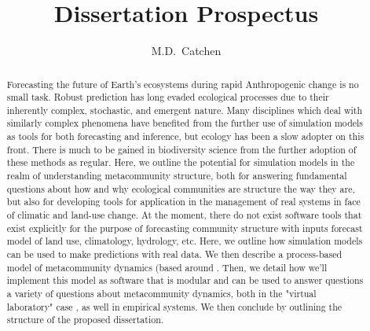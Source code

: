 \documentclass[]{article}
\title{Dissertation Prospectus}
\author{M.D.~Catchen}
\date{}
\begin{document}
\maketitle
\begin{abstract}
Forecasting the future of Earth's ecosystems during rapid Anthropogenic change is no small task.
Robust prediction has long evaded ecological processes due to their inherently complex, stochastic, and emergent nature.
Many disciplines which deal with similarly complex phenomena have benefited from the further use of simulation models as tools for both forecasting and inference, but ecology has been a slow adopter on this front.
There is much to be gained in biodiversity science from the further adoption of these methods as regular.
Here, we outline the potential for simulation models in the realm of understanding metacommunity structure, both for answering fundamental questions about how and why ecological communities are structure the way they are, but also for developing tools for application in the management of real systems in face of climatic and land-use change.
At the moment, there do not exist software tools that exist explicitly for the purpose of forecasting community structure with inputs forecast model of land use, climatology, hydrology, etc.
Here, we outline how simulation models can be used to make predictions with real data.
We then describe a process-based model of metacommunity dynamics (based around \citep{vellend_conceptual_2010, poisot_beyond_2015, thompson_process-based_2020}.
Then, we detail how we'll implement this model as software that is modular and can be used to answer questions a variety of questions about metacommunity dynamics, both in the "virtual laboratory" case \citep{railsback_agent-based_2011}, as well in empirical systems.
We then conclude by outlining the structure of the proposed dissertation.
\end{abstract}

\pagebreak
\end{document}
